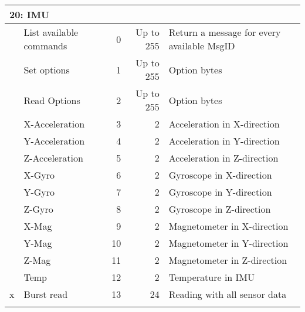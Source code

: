 \begin{table}[h]
\centering
	\begin{tabular}{llrrl}
	\toprule
	\multicolumn{5}{l}{\textbf{20: IMU}}\\
	\midrule
	& List available commands & 0 & Up to 255 & Return a message for every available MsgID\\
	& Set options & 1 & Up to 255 & Option bytes\\
	& Read Options & 2 & Up to 255 & Option bytes\\
	& X-Acceleration & 3 & 2 & Acceleration in X-direction\\
	& Y-Acceleration & 4 & 2 & Acceleration in Y-direction\\
	& Z-Acceleration & 5 & 2 & Acceleration in Z-direction\\
	& X-Gyro & 6 & 2 & Gyroscope in X-direction\\
	& Y-Gyro & 7 & 2 & Gyroscope in Y-direction\\
	& Z-Gyro & 8 & 2 & Gyroscope in Z-direction\\
	& X-Mag & 9 & 2 & Magnetometer in X-direction\\
	& Y-Mag & 10 & 2 & Magnetometer in Y-direction\\
	& Z-Mag & 11 & 2 & Magnetometer in Z-direction\\
	& Temp & 12 & 2 & Temperature in IMU\\
	x& Burst read & 13 & 24 & Reading with all sensor data\\
	\midrule
	\label{tab:commands}
	\end{tabular}
\end{table}
\newpage
